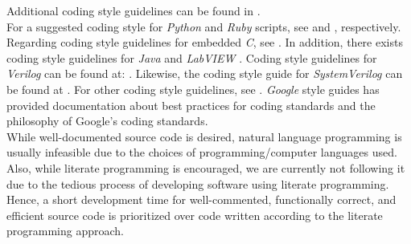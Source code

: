 \documentclass[letter,12pt]{article}
\begin{document}
Additional coding style guidelines can be found in \cite{Costan2019,Basalaj2013,ProgrammingResearchLtdStaff2013,Thereska20XY,Hoff2008a,ScienceInfusionSoftwareEngineeringProcessGroupStaff2006,Cargill1992,Misfeldt2004}. \\

For a suggested coding style for {\it Python} and {\it Ruby} scripts, see \cite{Osborne2018b,vanRossum2013} and \cite{Macdonald20XY}, respectively. Regarding coding style guidelines for embedded {\it C}, see \cite{Barr2013,Labrosse1999}. In addition, there exists coding style guidelines for {\it Java} \cite{OracleCorporationStaff20XYa,Smith2003,OracleCorporationStaff2016b,OracleCorporationStaff2016,OracleCorporationStaff20XY,Long1995,Carrano2012} and {\it LabVIEW} \cite{Blume2007a,Conway2003}. Coding style guidelines for {\it Verilog} can be found at: \cite{Bening2001,Bening2000}. Likewise, the coding style guide for {\it SystemVerilog} can be found at \cite{Mintz2007}. For other coding style guidelines, see \cite{Wolf20XY,Cady2017,IntelCorporationStaff2015,Schneider2013a,Weatherwax2008,Laplante2012,McConnell2004,Feathers2005,Koopman2010,Valvano2007,Fingeroff2010,Shore2008,Schach2007,Kernighan1982}. {\it Google} style guides \cite{GoogleStyleguideContributors2019} has provided documentation about best practices \cite{Osborne2018a} for coding standards and the philosophy \cite{Osborne2018} of Google's coding standards. \\




While well-documented source code is desired, natural language programming \cite{WikipediaContributors2016i} is usually infeasible due to the choices of programming/computer languages used. Also, while literate programming \cite{Knuth1984,Knuth1992a,McConnell2004,Subramaniam2006,Schach2007,Oram2007,MullerHannemann2010}
 is encouraged, we are currently not following it due to the tedious process of developing software using literate programming. Hence, a short development time for well-commented, functionally correct, and efficient source code is prioritized over code written according to the literate programming approach.
\end{document}
